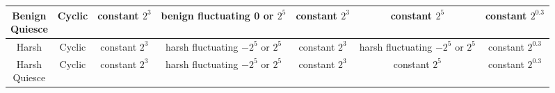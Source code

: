 \documentclass[PhD]{msu-thesis}
\begin{document}
\begin{table}[]
\begin{tabular}{|c|c||c|c||c|c|c|}
	\makecell{Benign \\ Quiesce} & Cyclic & \makecell{constant \\ $2^3$} & \makecell{benign \\ fluctuating \\ 0 or $2^5$} & \makecell{constant \\ $2^3$} & \makecell{constant \\ $2^5$} & \makecell{constant \\ $2^{0.3}$} \\\hline
	Harsh & Cyclic & \makecell{constant \\ $2^3$} & \makecell{harsh \\ fluctuating \\ $-2^5$ or $2^5$} & \makecell{constant \\ $2^3$} & \makecell{harsh \\ fluctuating \\ $-2^5$ or $2^5$} & \makecell{constant \\ $2^{0.3}$} \\\hline
	\makecell{Harsh \\ Quiesce} & Cyclic & \makecell{constant \\ $2^3$} & \makecell{harsh \\ fluctuating \\ $-2^5$ or $2^5$} & \makecell{constant \\ $2^3$} & \makecell{constant \\ $2^5$} & \makecell{constant \\ $2^{0.3}$} \\\hline


\end{tabular}
\end{table}
\end{document}
